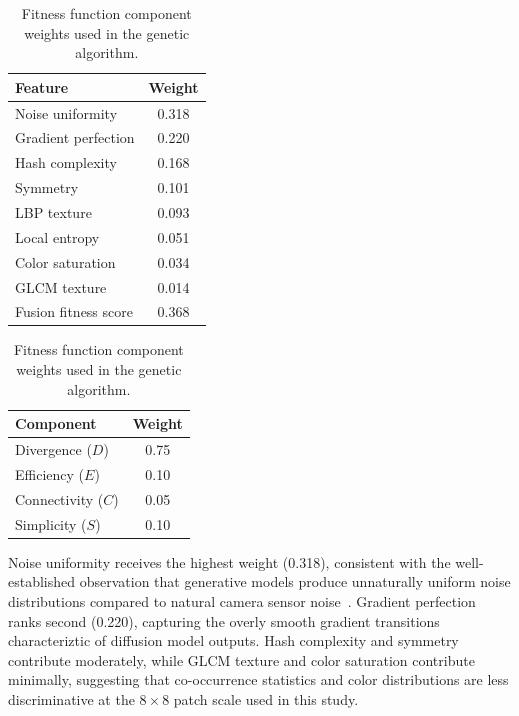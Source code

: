\documentclass[runningheads]{llncs}
\begin{document}
\begin{table}[!htbp]
\begin{minipage}[t]{0.48\textwidth}
\centering
\caption{Learned feature weights from Phase~1 Bayesian optimization.}
\label{tab:feature_weights}
\vspace{0.5ex}
\setlength{\tabcolsep}{4pt}
\small
\begin{tabular}{@{}lc@{}}
\toprule
Feature & Weight \\
\midrule
Noise uniformity & 0.318 \\
Gradient perfection & 0.220 \\
Hash complexity & 0.168 \\
Symmetry & 0.101 \\
LBP texture & 0.093 \\
Local entropy & 0.051 \\
Color saturation & 0.034 \\
GLCM texture & 0.014 \\
\midrule
Fusion fitness score & 0.368 \\
\bottomrule
\end{tabular}
\end{minipage}
\hfill
\begin{minipage}[t]{0.48\textwidth}
\centering
\caption{Fitness function component weights used in the genetic algorithm.}
\label{tab:fitness_weights}
\vspace{0.5ex}
\setlength{\tabcolsep}{4pt}
\small
\begin{tabular}{@{}lc@{}}
\toprule
Component & Weight \\
\midrule
Divergence ($D$) & 0.75 \\
Efficiency ($E$) & 0.10 \\
Connectivity ($C$) & 0.05 \\
Simplicity ($S$) & 0.10 \\
\bottomrule
\end{tabular}
\end{minipage}
\end{table}

Noise uniformity receives the highest weight (0.318), consistent with the well-established observation that generative models produce unnaturally uniform noise distributions compared to natural camera sensor noise~\cite{liu2022detecting}. Gradient perfection ranks second (0.220), capturing the overly smooth gradient transitions characteriztic of diffusion model outputs. Hash complexity and symmetry contribute moderately, while GLCM texture and color saturation contribute minimally, suggesting that co-occurrence statistics and color distributions are less discriminative at the $8\times 8$ patch scale used in this study.
\end{document}
